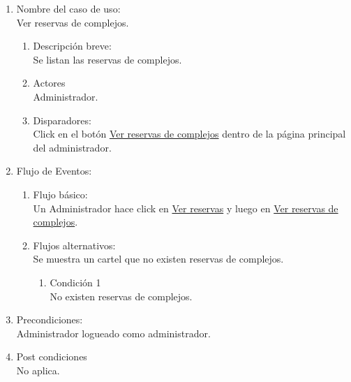 \documentclass[a4paper,11pt]{article}
\begin{document}
\begin{enumerate}

    \item Nombre del caso de uso: \\
    Ver reservas de complejos.

    \begin{enumerate}
    \item Descripción breve: \\
        Se listan las reservas de complejos.
    \item Actores \\
        Administrador.
    \item Disparadores: \\
        Click en el botón \underline{Ver reservas de complejos}
        dentro de la página principal del administrador.
    \end{enumerate}

    \item Flujo de Eventos: \\

    \begin{enumerate}

        \item Flujo básico:\\
            Un Administrador hace click en \underline{Ver reservas} y luego
            en \underline{Ver reservas de complejos}.
        \item Flujos alternativos:\\
            Se muestra un cartel que no existen reservas de complejos.
            \begin{enumerate}
                \item Condición 1 \\
                    No existen reservas de complejos.
            \end{enumerate}

    \end{enumerate}

    \item Precondiciones: \\
        Administrador logueado como administrador.

    \item Post condiciones \\
        No aplica.

\end{enumerate}
\end{document}
